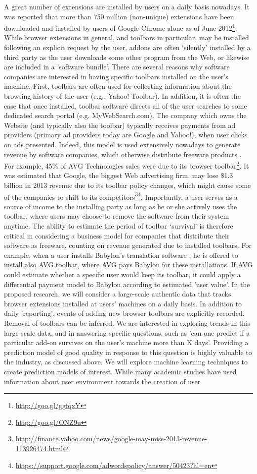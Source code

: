 \documentclass[11pt,oneside]{book}
\begin{document}
A great number of extensions are installed by users on a daily basis nowadays. It was reported that more than 750 million (non-unique) extensions have been downloaded and installed by users of Google Chrome alone as of June 2012\footnote{\url{http://goo.gl/ggfqxY}}. While browser extensions in general, and toolbars in particular, may be installed following an explicit request by the user, addons are often `silently' installed by a third party as the user downloads some other program from the Web, or likewise are included in a 'software bundle'. There are several reasons why software companies are interested in having specific toolbars installed on the user's machine. First, toolbars are often used for collecting information about the browsing history of the user (e.g., Yahoo! Toolbar). In addition, it is often the case that once installed, toolbar software directs all of the user searches to some dedicated search portal (e.g. MyWebSearch.com). 
The company which owns the Website (and typically also the toolbar) typically receives payments from ad providers (primary ad providers today are Google and Yahoo!), when user clicks on ads presented. Indeed, this model is used extensively nowadays to generate revenue by software companies, which otherwise distribute freeware products \citep{leontiadis2012don}. For example, 45\% of AVG Technologies sales were due to its browser toolbar\footnote{\url{http://goo.gl/ONZ9u}}.  It was estimated that Google, the biggest Web advertising firm, may lose \$1.3 billion in 2013 revenue  due to its toolbar policy changes, which might cause some of the companies to shift to its competitors\footnote{\url{http://finance.yahoo.com/news/google-may-miss-2013-revenue-113926474.html}}\footnote{\url{https://support.google.com/adwordspolicy/answer/50423?hl=en}}.
\iffalse 
Importantly, a user serves as a source of income to the installing party as long as he or she actively uses the toolbar, where users may choose to remove the software from their system anytime. The ability to estimate the period of toolbar ‘survival’ is therefore critical in considering a business model for companies that distribute their software as freeware, counting on revenue generated due to installed toolbars. For example, when a user installs Babylon's translation software , he is offered to install also AVG toolbar, where AVG pays Babylon for these installations. If AVG could estimate whether a specific user would keep its toolbar, it could apply a differential payment model to Babylon according to estimated 'user value'.  In the proposed research, we will consider a large-scale authentic data that tracks browser extensions installed at users' machines on a daily basis. In addition to daily 'reporting', events of adding new browser toolbars are explicitly recorded. Removal of toolbars can be inferred. We are interested in exploring trends in this large-scale data, and in answering specific questions, such as 'can one predict if a particular add-on survives on the user's machine more than K days'. Providing a prediction model of good quality in response to this question is highly valuable to the industry, as discussed above. We will explore machine learning techniques to create prediction models of interest. While many academic studies have used information about user environment towards the creation of user
\end{document}
